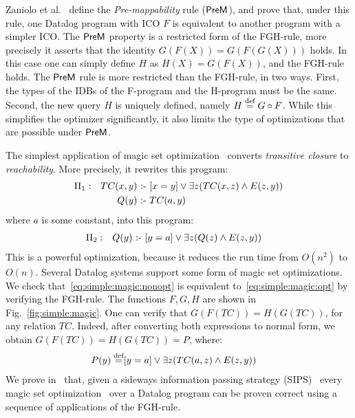 \begin{ex} Zaniolo et
  al.~\cite{DBLP:journals/tplp/ZanioloYDSCI17} define the {\em
    Pre-mappability} rule ($\textsf{PreM}$), and prove that, under this
  rule, one Datalog program with ICO $F$ is equivalent to
  another program with a simpler ICO.
  The $\textsf{PreM}$ property is a
  restricted form of the FGH-rule, more precisely it asserts that the
  identity $G(F(X))=G(F(G(X)))$ holds.  In this case one can simply
  define $H$ as $H(X) = G(F(X))$, and the FGH-rule holds.  The $\textsf{PreM}$
  rule is more restricted than the FGH-rule, in two ways.  First, the
  types of the IDBs of the F-program and the H-program must be the
  same.  Second, the new query $H$ is uniquely
  defined, namely $H \stackrel{\text{def}}{=} G\circ F$.  While this simplifies the
  optimizer significantly, it also limits the type of optimizations
  that are possible under $\textsf{PreM}$.
\end{ex}


\begin{ex}\label{ex:simple:magic} The simplest
  application of magic set
  optimization~\cite{DBLP:conf/pods/BancilhonMSU86,DBLP:conf/sigmod/MumickP94,DBLP:conf/sigmod/MumickFPR90}
  converts {\em transitive closure} to {\em reachability}.  More
  precisely, it rewrites this program:
%
  \begin{align}
\Pi_1: &&    TC(x,y) \text{ :- } & [x=y] \vee \exists z(TC(x,z) \wedge E(z,y))\nonumber\\
       &&    Q(y) \text{ :- } & TC(a,y) \label{eq:simple:magic:nonopt}
  \end{align}
%
  where $a$ is some constant, into this program:
%
  \begin{align}
\Pi_2: &&   Q(y) \text{ :- } & [y=a] \vee \exists z(Q(z) \wedge E(z,y)) \label{eq:simple:magic:opt}
  \end{align}
%
  This is a powerful optimization, because it reduces the run time from
  $O(n^2)$ to $O(n)$.  Several Datalog systems support some form of
  magic set optimizations.  We check
  that~\eqref{eq:simple:magic:nonopt} is equivalent
  to~\eqref{eq:simple:magic:opt} by verifying the FGH-rule.  The
  functions $F, G, H$ are shown in Fig.~\ref{fig:simple:magic}.  One
  can verify that $G(F(TC))=H(G(TC))$, for any relation $TC$.  Indeed,
  after converting both expressions to normal form, we obtain
  $G(F(TC))=H(G(TC)) = P$, where:
%
  \begin{align*}
    P(y) \stackrel{\text{def}}{=} & [y=a] \vee \exists z(TC(a,z) \wedge E(z,y))
  \end{align*}
  We prove in~\cite{DBLP:journals/corr/abs-2202-10390} that, given a sideways information
  passing strategy (SIPS)~\cite{DBLP:journals/jlp/BeeriR91} every magic set
  optimization~\cite{DBLP:journals/jlp/BalbinPRM91} over a Datalog program can be
  proven correct using a sequence of applications of the FGH-rule.
\end{ex}

